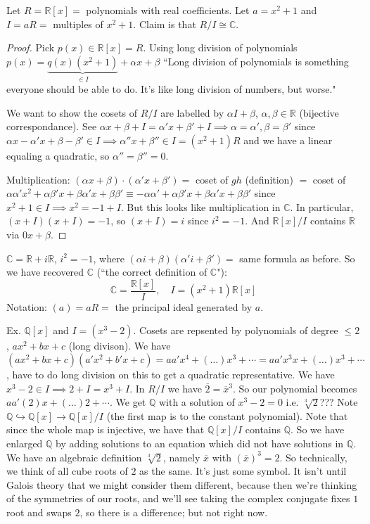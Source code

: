 \documentclass{article}
\theoremstyle{plain}
\theoremstyle{remark}
\newcommand{\Q}{{\mathbb Q}}
\newcommand{\R}{{\mathbb R}}
\newcommand{\C}{{\mathbb C}}
\begin{document}
Let $R = \R[x] = $ polynomials with real coefficients.
Let $a = x^2 + 1$ and $I = aR = $ multiples of $x^2 + 1$.
Claim is that $R/I \cong \C$.
\begin{proof}
	Pick $p(x) \in \R[x] = R$.
	Using long division of polynomials
	$p(x) = \underbrace{q(x)(x^2+1)}_{\in I} + \alpha x + \beta$
	``Long division of polynomials is something everyone should be able to do.
	It's like long division of numbers, but worse."

	We want to show the cosets of $R/I$ are
	labelled by $\alpha I + \beta$, $\alpha,\beta \in \R$ (bijective correspondance).
	See $\alpha x + \beta + I = \alpha' x + \beta' + I
	\implies \alpha = \alpha', \beta = \beta'$
	since $\alpha x - \alpha'x + \beta - \beta' \in I
	\implies \alpha''x + \beta'' \in I = (x^2+1)R$
	and we have a linear equaling a quadratic, so $\alpha''=\beta''=0$.

	Multiplication: $(\alpha x + \beta)\cdot(\alpha'x + \beta')
	=$ coset of $gh$ (definition) $ = $ coset of
	$\alpha\alpha'x^2 + \alpha\beta'x + \beta\alpha'x + \beta\beta'
	\equiv -\alpha\alpha' + \alpha \beta'x + \beta\alpha'x + \beta\beta'$
	since $x^2 + 1 \in I \implies x^2 = -1 + I$.
	But this looks like multiplication in $\C$.
	In particular, $(x+I)(x+I) = -1$, so $(x+I) = i$ since $i^2 = -1$.
	And $\R[x]/I$ contains $\R$ via $0x+\beta$.
\end{proof}
$\C = \R + i\R$, $i^2 = -1$,
where $(\alpha i + \beta)(\alpha'i + \beta') = $ same formula as before.
So we have recovered $\C$ (``the correct definition of $\C$"):
\[
	\C = \frac{\R[x]}{I}, \quad I = (x^2+1)\R[x]
\]
Notation: $(a) = aR = $ the principal ideal generated by $a$.

Ex. $\Q[x]$ and $I = (x^3 - 2)$.
Cosets are repsented by polynomials of degree $\leq 2$, $ax^2 + bx + c$
(long divison).
We have $(ax^2+bx+c)(a'x^2+b'x+c) = aa'x^4+(\dots)x^3+ \cdots
= aa'x^3x + (\dots)x^3 + \cdots$,
have to do long division on this to get a quadratic representative.
We have $x^3 - 2 \in I \implies 2 + I = x^3 + I$.
In $R/I$ we have $\overline{2} = \overline{x}^3$.
So our polynomial becomes $aa'(2)x + (\dots)2 + \cdots$.
We get $\Q$ with a solution of $x^3 - 2 = 0$ i.e. $\sqrt[3]{2}$???
Note $\Q \hookrightarrow \Q[x] \to \Q[x]/I$
(the first map is to the constant polynomial).
Note that since the whole map is injective, we have that $\Q[x]/I$ contains $\Q$.
So we have enlarged $\Q$ by adding solutions to an equation which
did not have solutions in $\Q$.
We have an algebraic definition $\sqrt[3]{2}$, namely
$\overline{x}$ with $(\overline{x})^3 = 2$.
So technically, we think of all cube roots of $2$ as the same.
It's just some symbol.
It isn't until Galois theory that we might consider them different,
because then we're thinking of the symmetries of our roots,
and we'll see taking the complex conjugate fixes $1$ root and swaps $2$,
so there is a difference; but not right now.
\end{document}
